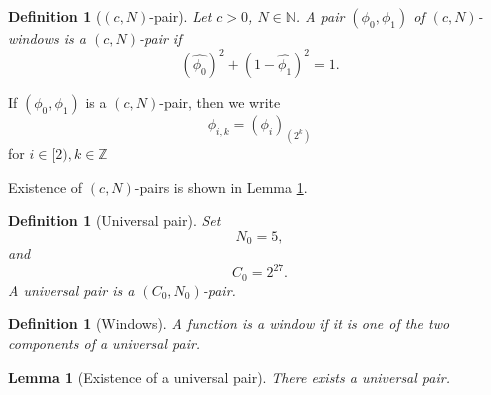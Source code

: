 \documentclass[12pt,reqno]{amsart}
\theoremstyle{plain}
\newtheorem{lemma}[theorem]{Lemma}
\newtheorem{definition}[theorem]{Definition}
\numberwithin{equation}{section}
\theoremstyle{remark}
\newcommand{\using}[1]{}
\begin{document}
\begin{definition}[$(c,N)$-pair]
\label{def:cpair}
Let $c > 0$, $N\in\mathbb{N}$.  A pair $(\phi_0,\phi_1)$ of $(c,N)$-windows is a {\em $(c,N)$-pair} if
\begin{equation}\label{windowsum}
(\widehat{\phi_0})^2+(1-\widehat{\phi_1})^2=1.
\end{equation}
\end{definition}
If $(\phi_0,\phi_1)$ is a $(c,N)$-pair, then we write
\begin{equation}\label{auto:rescaled-window-notation}\phi_{i,k}=(\phi_i)_{(2^{k})}\end{equation}
for $i\in [2), k\in\mathbb{Z}$

Existence of $(c,N)$-pairs is shown in Lemma \ref{lem:cpair}.

\begin{definition}[Universal pair]\label{def:unipair}
Set
\begin{equation}\label{universal pair parameters}
N_0=5,
\end{equation}
and
\begin{equation}\label{auto:universal-window-constant}
C_0=2^{27}.
\end{equation}
A universal pair is a $(C_0,N_0)$-pair.
\end{definition}

\begin{definition}[Windows]\label{def:window}
A function is a window if it is one of the two components of a universal pair.
\end{definition}

\begin{lemma}[Existence of a universal pair]\label{lem:cpair}\using{standard bump properties}
There exists a universal pair.
\end{lemma}
\end{document}

